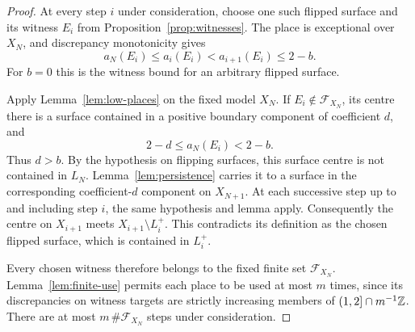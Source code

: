 \begin{proof}
At every step $i$ under consideration, choose one such flipped surface
and its witness $E_i$ from Proposition~\ref{prop:witnesses}.  The place
is exceptional over $X_N$, and discrepancy monotonicity gives
\begin{equation}\label{eq:tail-witness-bound}
 a_N(E_i)\leq a_i(E_i)<a_{i+1}(E_i)\leq2-b.
\end{equation}
For $b=0$ this is the witness bound for an arbitrary flipped surface.

Apply Lemma~\ref{lem:low-places} on the fixed model $X_N$.  If
$E_i\notin\mathcal F_{X_N}$, its centre there is a surface contained
in a positive boundary component of coefficient $d$, and
\[
 2-d\leq a_N(E_i)<2-b.
\]
Thus $d>b$.  By the hypothesis on flipping surfaces, this surface
centre is not contained in $L_N$.  Lemma~\ref{lem:persistence} carries
it to a surface in the corresponding coefficient-$d$ component on
$X_{N+1}$.  At each successive step up to and including step $i$, the
same hypothesis and lemma apply.  Consequently the centre on $X_{i+1}$
meets $X_{i+1}\setminus L_i^+$.  This contradicts its definition as
the chosen flipped surface, which is contained in $L_i^+$.

Every chosen witness therefore belongs to the fixed finite set
$\mathcal F_{X_N}$.  Lemma~\ref{lem:finite-use} permits each place to
be used at most $m$ times, since its discrepancies on witness targets
are strictly increasing members of $(1,2]\cap m^{-1}\mathbb Z$.  There are
at most $m\,\#\mathcal F_{X_N}$ steps under consideration.
\end{proof}

